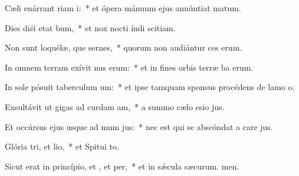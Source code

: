 \item Cæli enárrant riam i:~* et ópera mánuum ejus annúntiat matum.
\item Dies diéi etat bum,~* et nox nocti índi scitiam.
\item Non sunt loquélæ, que sernes,~* quorum non audiántur ces erum.
\item In omnem terram exívit nus erum:~* et in fines orbis terræ ba erum.
\item In sole pósuit taberculum um:~* et ipse tamquam sponsus procédens de lamo o.
\item Exsultávit ut gigas ad curdam am,~* a summo cælo esio jus.
\item Et occúrsus ejus usque ad mum jus:~* nec est qui se abscóndat a care jus.
\item Glória tri, et lio,~* et Spitui to.
\item Sicut erat in princípio, et , et per,~* et in sǽcula sæcurum. men.
